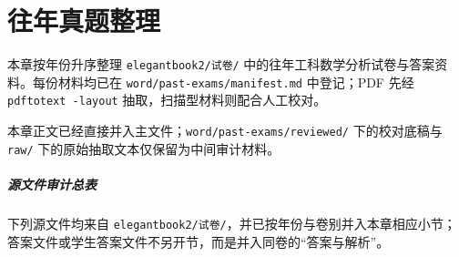 \chapter{往年真题整理}

本章按年份升序整理 \texttt{elegantbook2/试卷/} 中的往年工科数学分析试卷与答案资料。每份材料均已在 \texttt{word/past-exams/manifest.md} 中登记；PDF 先经 \texttt{pdftotext -layout} 抽取，扫描型材料则配合人工校对。

\begin{note}
本章正文已经直接并入主文件；\texttt{word/past-exams/reviewed/} 下的校对底稿与 \texttt{raw/} 下的原始抽取文本仅保留为中间审计材料。
\end{note}

\paragraph*{源文件审计总表}
下列源文件均来自 \texttt{elegantbook2/试卷/}，并已按年份与卷别并入本章相应小节；答案文件或学生答案文件不另开节，而是并入同卷的“答案与解析”。
